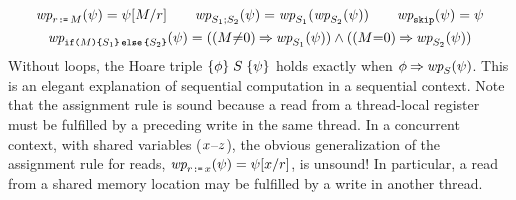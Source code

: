 \begin{gather*}
  \fwp{\LET{\aReg}{\aExp}}{\bForm} = \bForm[\aExp/\aReg]
  \qquad
  \fwp{\aCmd_1;\aCmd_2}{\bForm} = \fwp{\aCmd_1}{\fwp{\aCmd_2}{\bForm}}
  \qquad
  \fwp{\SKIP}{\bForm} = \bForm
  \\
  \fwp{\IF{\aExp}\THEN \aCmd_1\ELSE \aCmd_2\FI}{\bForm}= 
  ((\aExp{\ne}0) \limplies \fwp{\aCmd_1}{\bForm}) \land
  ((\aExp{=}0) \limplies \fwp{\aCmd_2}{\bForm})
\end{gather*}    
Without loops, the Hoare triple
$\{\phi\}\allowbreak\;S\;\allowbreak\{\psi\}$ holds exactly when $\aForm \limplies
\fwp{\aCmd}{\bForm}$.
This is an elegant explanation of sequential computation in a sequential
context. Note that the assignment rule %
is sound because a read from a thread-local
register must be fulfilled by a preceding write in the same thread.
In a concurrent context, with shared variables
($x$--$z$), the obvious generalization of the assignment rule
for reads,
$\fwp{\LET{\aReg}{\aLoc}}{\bForm} = \bForm[\aLoc/\aReg]$,
is unsound!
In particular, a read from a shared memory location may be fulfilled by a write
in another thread.


